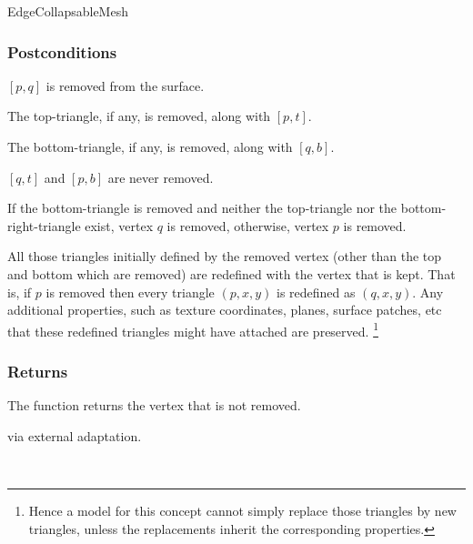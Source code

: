 \begin{ccRefConcept}{EdgeCollapsableMesh}
 

\subsubsection*{Postconditions}
      
$[p,q]$ is removed from the surface.

The top-triangle, if any, is removed, along with $[p,t]$.

The bottom-triangle, if any, is removed, along with $[q,b]$.

$[q,t]$ and $[p,b]$ are never removed.
  
If the bottom-triangle is removed and neither the top-triangle nor
the bottom-right-triangle exist, vertex $q$ is removed,
otherwise, vertex $p$ is removed.

All those triangles initially defined by the removed vertex 
(other than the top and bottom which are removed) are redefined
with the vertex that is kept. That is, if $p$ is removed then
every triangle $(p,x,y)$ is redefined as $(q,x,y)$. Any
additional properties, such as texture coordinates, planes,
surface patches, etc that these redefined triangles might have
attached are preserved.
\footnote{Hence a model for this concept cannot simply replace
those triangles by new triangles, unless the replacements 
inherit the corresponding properties.}

\subsubsection*{Returns}

The function returns the vertex that is not removed.

\ccHasModels
{} via external adaptation.

\ccSeeAlso
{}\\

\end{ccRefConcept}

